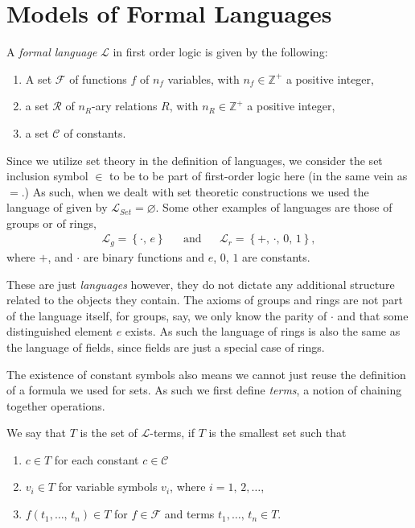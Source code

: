 \documentclass[../../main.tex]{subfiles}
\begin{document}
\section{Models of Formal Languages}
\begin{definition}\cite[Definition 1.1.1]{Mar02}
    A \textit{formal language} $\mathcal{L}$ in first order logic is given by the following:
    \begin{enumerate}
        \item A set $\mathcal{F}$ of functions $f$ of $n_f$ variables, with $n_f \in \mathbb{Z}^+$ a positive integer,
        \item a set $\mathcal{R}$ of $n_R$-ary relations $R$, with $n_R \in \mathbb{Z}^+$ a positive integer,
        \item a set $\mathcal{C}$ of constants.
    \end{enumerate}
\end{definition}

Since we utilize set theory in the definition of languages, we consider the set inclusion symbol $\in$ to be to be part of first-order logic here (in the same vein as $=$.)
As such, when we dealt with set theoretic constructions we used the language of given by $\mathcal{L}_{Set} = \varnothing$.
Some other examples of languages are those of groups or of rings,
\begin{align*}
    \mathcal{L}_g = \left\{\cdot,\, e\right\} 
    && \text{and} &&
    \mathcal{L}_r = \left\{+,\,\cdot,\, 0,\, 1\right\},
\end{align*}
where $+$, and $\cdot$ are binary functions and $e$, $0$, $1$ are constants.

These are just \textit{languages} however, they do not dictate any additional structure related to the objects they contain.
The axioms of groups and rings are not part of the language itself, for groups, say, we only know the parity of $\cdot$ and that some distinguished element $e$ exists.
As such the language of rings is also the same as the language of fields, since fields are just a special case of rings.

The existence of constant symbols also means we cannot just reuse the definition of a formula we used for sets.
As such we first define \textit{terms}, a notion of chaining together operations.

\begin{definition}\cite[Definition 1.1.4]{Mar02}
    We say that $T$ is the set of $\mathcal{L}$-terms, if $T$ is the smallest set such that
    \begin{enumerate}
        \item $c \in T$ for each constant $c \in \mathcal{C}$
        \item $v_i \in T$ for variable symbols $v_i$, where $i = 1,\, 2,\ldots$,
        \item $f(t_1,\ldots,\, t_n) \in T$ for $f \in \mathcal{F}$ and terms $t_1,\ldots,\, t_n \in T$.
    \end{enumerate}
\end{definition}
\end{document}
